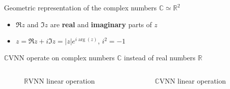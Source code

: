 \documentclass{beamer}
\newcommand{\real}{\mathbb{R}}
\newcommand{\cplx}{\mathbb{C}}
\newcommand{\conj}[1]{\overline{#1}}
\begin{document}
\begin{frame}[c]{\insertsection}
  Geometric representation of the complex numbers $\cplx \simeq \real^2$
  \begin{itemize}
    \item $\Re{z}$ and $\Im{z}$ are \textbf{real} and \textbf{imaginary} parts of $z$
    \item $z = \Re{z} + i \Im{z} = \lvert z \rvert e^{i \arg{\!(z)}}$, $i^2 = -1$
  \end{itemize}
  \bigskip
  $\cplx$VNN operate on complex numbers $\cplx$ instead of real numbers $\real$
  \vspace{-1em}
  \begin{columns}[T]
    \begin{column}{0.45\linewidth}
      \begin{figure}
          
        {$\real$VNN linear operation}
      \end{figure}
    \end{column}%
    \begin{column}{0.45\linewidth}
      \begin{figure}
          
        {$\cplx$VNN linear operation}
      \end{figure}
    \end{column}
  \end{columns}




\end{frame}
\end{document}

